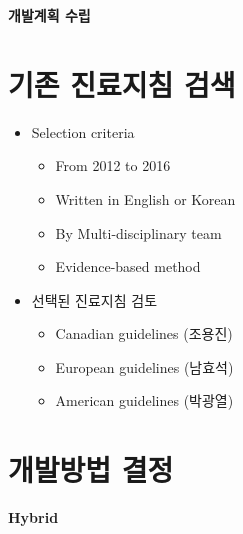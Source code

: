 \documentclass{paper}
\begin{document}
\Large \textbf{개발계획 수립} \normalsize

\section{기존 진료지침 검색}
	\begin{itemize}
		\item Selection criteria
			\begin{itemize}
				\item From 2012 to 2016
				\item Written in English or Korean
				\item By Multi-disciplinary team
				\item Evidence-based method
			\end{itemize}
		\item 선택된 진료지침 검토
		\begin{itemize}
			\item Canadian guidelines (조용진)
			\item European guidelines (남효석)
			\item American guidelines (박광열)
		\end{itemize}
	\end{itemize}
	
\section{개발방법 결정}

\textbf{Hybrid}

\end{document}

